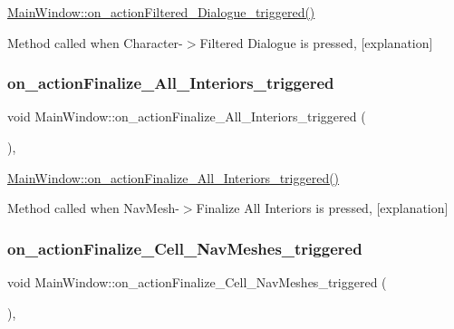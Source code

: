 \hyperlink{class_main_window_a854ffd157a8571cc473a10628cf1967a}{Main\+Window\+::on\+\_\+action\+Filtered\+\_\+\+Dialogue\+\_\+triggered()} 

Method called when Character-\/$>$Filtered Dialogue is pressed, \mbox{[}explanation\mbox{]} \mbox{\label{class_main_window_a0976f59dc5b7864ab50343653dfc48ac}} 
\subsubsection{\texorpdfstring{on\+\_\+action\+Finalize\+\_\+\+All\+\_\+\+Interiors\+\_\+triggered}{on\_actionFinalize\_All\_Interiors\_triggered}}
{\footnotesize\ttfamily void Main\+Window\+::on\+\_\+action\+Finalize\+\_\+\+All\+\_\+\+Interiors\+\_\+triggered (\begin{DoxyParamCaption}{ }\end{DoxyParamCaption})\hspace{0.3cm}{\ttfamily [private]}, {\ttfamily [slot]}}



\hyperlink{class_main_window_a0976f59dc5b7864ab50343653dfc48ac}{Main\+Window\+::on\+\_\+action\+Finalize\+\_\+\+All\+\_\+\+Interiors\+\_\+triggered()} 

Method called when Nav\+Mesh-\/$>$Finalize All Interiors is pressed, \mbox{[}explanation\mbox{]} \mbox{\label{class_main_window_ac6952d7d9fe31aa25e570b898eb5257d}} 
\subsubsection{\texorpdfstring{on\+\_\+action\+Finalize\+\_\+\+Cell\+\_\+\+Nav\+Meshes\+\_\+triggered}{on\_actionFinalize\_Cell\_NavMeshes\_triggered}}
{\footnotesize\ttfamily void Main\+Window\+::on\+\_\+action\+Finalize\+\_\+\+Cell\+\_\+\+Nav\+Meshes\+\_\+triggered (\begin{DoxyParamCaption}{ }\end{DoxyParamCaption})\hspace{0.3cm}{\ttfamily [private]}, {\ttfamily [slot]}}



